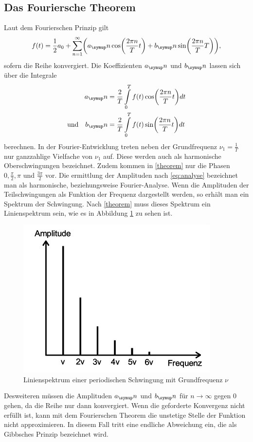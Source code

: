 \subsection{Das Fouriersche Theorem}
Laut dem Fourierschen Prinzip gilt
\begin{equation}
  f(t)=\frac{1}{2}a_0+\sum_{n=1}^\infty\biggl(a_\su{n}\cos\biggl(\frac{2\pi n}{T}t\biggr)
  +b_\su{n}\sin\biggl(\frac{2\pi n}{T}T\biggr)\biggr)
  \label{theorem} ,
\end{equation}
sofern die Reihe konvergiert. Die Koeffizienten $a_\su{n}$ und $b_\su{n}$
lassen sich über die Integrale
\begin{equation}
 \begin{split}
  a_\su{n} &= \frac{2}{T}\int\limits_{0}^{T} f(t)\cos\biggl(\frac{2\pi n}{T}t\biggr)dt \\
  \text{und}\quad b_\su{n} &= \frac{2}{T}\int\limits_{0}^{T} f(t)\sin\biggl(\frac{2\pi n}
  {T}t\biggr)dt
  \label{eq:analyse}
 \end{split}
\end{equation}
berechnen. In der Fourier-Entwicklung treten neben der Grundfrequenz
$\nu_1=\frac{1}{T}$ nur ganzzahlige Vielfache von $\nu_1$ auf. Diese werden auch
als harmonische Oberschwingungen bezeichnet. Zudem kommen in \eqref{theorem} nur
die Phasen $0, \frac{\pi}{2}, \pi$ und $\frac{3\pi}{2}$ vor.
Die ermittlung der Amplituden nach \eqref{eq:analyse} bezeichnet man als
harmonische, beziehungsweise Fourier-Analyse.
\newpage
Wenn die Amplituden der
Teilschwingungen als Funktion der Frequenz dargestellt werden, so erhält man ein
Spektrum der Schwingung. Nach \eqref{theorem} muss dieses Spektrum ein
Linienspektrum sein, wie es in Abbildung \ref{spektrum} zu sehen ist.
\begin{figure}[H]
  \centering
  \includegraphics{bilder/linienspektrum.jpg}
  \caption{Linienspektrum einer periodischen Schwingung mit Grundfrequenz $\nu$
  \cite{351}}
  \label{spektrum}
\end{figure}
Desweiteren müssen die Amplituden $a_\su{n}$ und $b_\su{n}$ für
$n\rightarrow\infty$ gegen 0 gehen, da die Reihe nur dann konvergiert.
Wenn die geforderte Konvergenz nicht erfüllt ist, kann mit dem Fourierschen
Theorem die unstetige Stelle der Funktion nicht approximieren. In diesem Fall
tritt eine endliche Abweichung ein, die als Gibbsches Prinzip bezeichnet wird.

